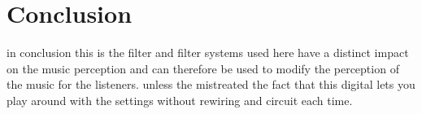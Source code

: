 
\section{Conclusion}
in conclusion this is the filter and filter systems used here have a distinct impact on the music perception and can therefore be used to modify the perception of the music for the listeners.
unless the mistreated the fact that this digital lets you play around with the settings without rewiring and circuit each time.

